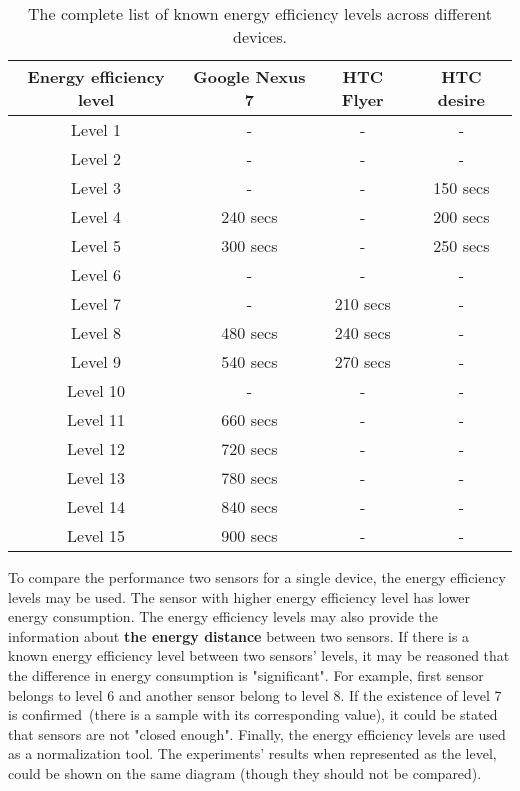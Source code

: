 	
\begin{table}[H]
\centering
    \begin{tabular}{| c | c | c | c |}
    \hline
      Energy efficiency level & Google Nexus 7 & HTC Flyer & HTC desire \\ \hline
    Level 1 & -& - &  -\\ \hline
  	Level 2 & - & - & -\\ \hline
  	Level 3 & - & - & 150 secs\\ \hline
    Level 4 & 240 secs & - & 200 secs\\ \hline
    Level 5 & 300 secs & - & 250 secs \\ \hline
    Level 6 & - & - & - \\\hline
    Level 7 & - & 210 secs & - \\ \hline
    Level 8 & 480 secs & 240  secs & - \\ \hline
    Level 9 & 540 secs & 270 secs & - \\ \hline
    Level 10 & - & - & - \\ \hline
    Level 11 & 660 secs & - & - \\ \hline
    Level 12 & 720 secs & - & -\\ \hline
    Level 13 & 780 secs & - & - \\ \hline
    Level 14 & 840 secs & - & -\\ \hline
    Level 15 & 900 secs & -& -\\ \hline
    \end{tabular}
    \caption{The complete list of known energy efficiency levels across different devices.}
	\label{table:energy_efficiency_levels}
\end{table}
	
To compare the performance two sensors for a single device, the energy efficiency levels may be used. The sensor with higher energy efficiency level has lower energy consumption. The energy efficiency levels may also provide the information about \textbf{the energy distance} between two sensors. If there is a known energy efficiency level between two sensors' levels, it may be reasoned that the difference in energy consumption is "significant". For example, first sensor belongs to level 6 and another sensor belong to level 8. If the existence of level 7 is confirmed\ (there is a sample with its corresponding value), it could be stated that sensors are not "closed enough". Finally, the energy efficiency levels are used as a normalization tool. The experiments' results when represented as the level, could be shown on the same diagram (though they should not be compared). 

